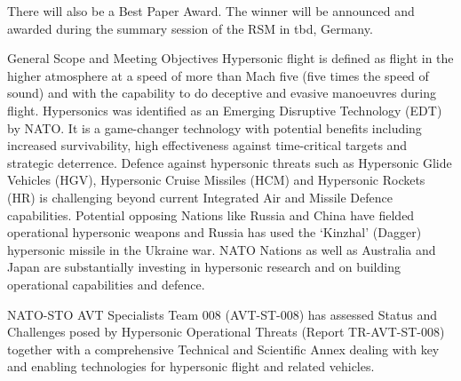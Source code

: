 There will also be a Best Paper Award. The winner will be announced and awarded during the summary session of the RSM in tbd, Germany.





General Scope and Meeting Objectives
Hypersonic flight is defined as flight in the higher atmosphere at a speed of more than Mach five (five times the speed of sound) and with the capability to do deceptive and evasive manoeuvres during flight. Hypersonics was identified as an Emerging Disruptive Technology (EDT) by NATO. It is a game-changer technology with potential benefits including increased survivability, high effectiveness against time-critical targets and strategic deterrence. Defence against hypersonic threats such as Hypersonic Glide Vehicles (HGV), Hypersonic Cruise Missiles (HCM) and Hypersonic Rockets (HR) is challenging beyond current Integrated Air and Missile Defence capabilities.
Potential opposing Nations like Russia and China have fielded operational hypersonic weapons and Russia has used the ‘Kinzhal’ (Dagger) hypersonic missile in the Ukraine war. NATO Nations as well as Australia and Japan are substantially investing in hypersonic research and on building operational capabilities and defence.

NATO-STO AVT Specialists Team 008 (AVT-ST-008) has assessed Status and Challenges posed by Hypersonic Operational Threats (Report TR-AVT-ST-008) together with a comprehensive Technical and Scientific Annex dealing with key and enabling technologies for hypersonic flight and related vehicles.
				

